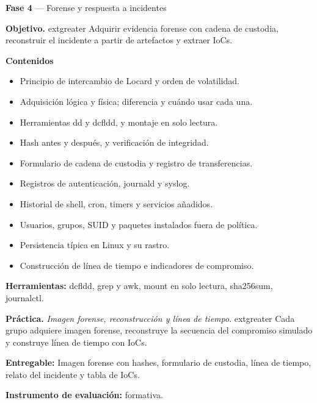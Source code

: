 \documentclass[11pt,a4paper]{article}
\begin{document}
\begin{tcolorbox}[cajaContenido,title={Semana 8 --- Forense digital: adquisición, artefactos y línea de tiempo}]
\textbf{Fase 4} --- Forense y respuesta a incidentes

\textbf{Objetivo.} 	extgreater{} Adquirir evidencia forense con cadena de custodia, reconstruir el incidente a partir de artefactos y extraer IoCs.

\textbf{Contenidos}

\begin{itemize}[leftmargin=1.4em,itemsep=2pt,topsep=3pt]
  \item Principio de intercambio de Locard y orden de volatilidad.
  \item Adquisición lógica y física; diferencia y cuándo usar cada una.
  \item Herramientas dd y dcfldd, y montaje en solo lectura.
  \item Hash antes y después, y verificación de integridad.
  \item Formulario de cadena de custodia y registro de transferencias.
  \item Registros de autenticación, journald y syslog.
  \item Historial de shell, cron, timers y servicios añadidos.
  \item Usuarios, grupos, SUID y paquetes instalados fuera de política.
  \item Persistencia típica en Linux y su rastro.
  \item Construcción de línea de tiempo e indicadores de compromiso.
\end{itemize}

\textbf{Herramientas:} dcfldd, grep y awk, mount en solo lectura, sha256sum, journalctl.

\textbf{Práctica.} \emph{Imagen forense, reconstrucción y línea de tiempo}. 	extgreater{} Cada grupo adquiere imagen forense, reconstruye la secuencia del compromiso simulado y construye línea de tiempo con IoCs.

\textbf{Entregable:} Imagen forense con hashes, formulario de custodia, línea de tiempo, relato del incidente y tabla de IoCs.

\textbf{Instrumento de evaluación:} formativa.
\end{tcolorbox}
\end{document}
